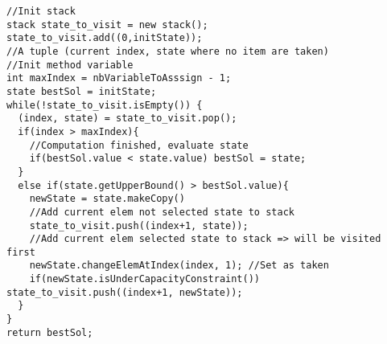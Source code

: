 \begin{lstlisting}
//Init stack
stack state_to_visit = new stack();
state_to_visit.add((0,initState)); 
//A tuple (current index, state where no item are taken)
//Init method variable
int maxIndex = nbVariableToAsssign - 1;
state bestSol = initState;
while(!state_to_visit.isEmpty()) {
  (index, state) = state_to_visit.pop();
  if(index > maxIndex){
  	//Computation finished, evaluate state
  	if(bestSol.value < state.value) bestSol = state;
  }
  else if(state.getUpperBound() > bestSol.value){
  	newState = state.makeCopy()
  	//Add current elem not selected state to stack
  	state_to_visit.push((index+1, state));
  	//Add current elem selected state to stack => will be visited first
  	newState.changeElemAtIndex(index, 1); //Set as taken
  	if(newState.isUnderCapacityConstraint()) state_to_visit.push((index+1, newState));
  }
}
return bestSol; 
\end{lstlisting}

